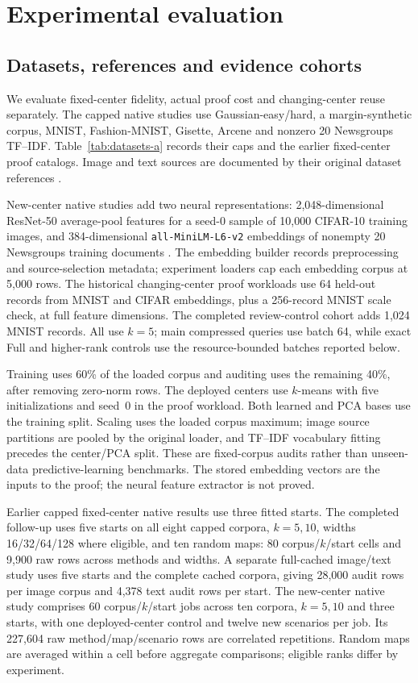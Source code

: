 \section{Experimental evaluation}\label{sec:method}
\subsection{Datasets, references and evidence cohorts}
We evaluate fixed-center fidelity, actual proof cost and changing-center reuse separately. The capped native studies use Gaussian-easy/hard, a margin-synthetic corpus, MNIST, Fashion-MNIST, Gisette, Arcene and nonzero 20 Newsgroups TF--IDF. Table~\ref{tab:datasets-a} records their caps and the earlier fixed-center proof catalogs. Image and text sources are documented by their original dataset references \cite{lecun1998,fashion2017,gisette2004,arcene2004,news20data}.


New-center native studies add two neural representations: 2,048-dimensional ResNet-50 average-pool features for a seed-0 sample of 10,000 CIFAR-10 training images, and 384-dimensional \texttt{all-MiniLM-L6-v2} embeddings of nonempty 20 Newsgroups training documents \cite{krizhevsky2009cifar,he2016resnet,reimers2019sbert,minilmv2model}. The embedding builder records preprocessing and source-selection metadata; experiment loaders cap each embedding corpus at 5,000 rows. The historical changing-center proof workloads use 64 held-out records from MNIST and CIFAR embeddings, plus a 256-record MNIST scale check, at full feature dimensions. The completed review-control cohort adds 1,024 MNIST records. All use $k=5$; main compressed queries use batch 64, while exact Full and higher-rank controls use the resource-bounded batches reported below.

Training uses 60\% of the loaded corpus and auditing uses the remaining 40\%, after removing zero-norm rows. The deployed centers use $k$-means with five initializations and seed~0 in the proof workload. Both learned and PCA bases use the training split. Scaling uses the loaded corpus maximum; image source partitions are pooled by the original loader, and TF--IDF vocabulary fitting precedes the center/PCA split. These are fixed-corpus audits rather than unseen-data predictive-learning benchmarks. The stored embedding vectors are the inputs to the proof; the neural feature extractor is not proved.

Earlier capped fixed-center native results use three fitted starts. The completed follow-up uses five starts on all eight capped corpora, $k=5,10$, widths 16/32/64/128 where eligible, and ten random maps: 80 corpus/$k$/start cells and 9,900 raw rows across methods and widths. A separate full-cached image/text study uses five starts and the complete cached corpora, giving 28,000 audit rows per image corpus and 4,378 text audit rows per start. The new-center native study comprises 60 corpus/$k$/start jobs across ten corpora, $k=5,10$ and three starts, with one deployed-center control and twelve new scenarios per job. Its 227,604 raw method/map/scenario rows are correlated repetitions. Random maps are averaged within a cell before aggregate comparisons; eligible ranks differ by experiment.

